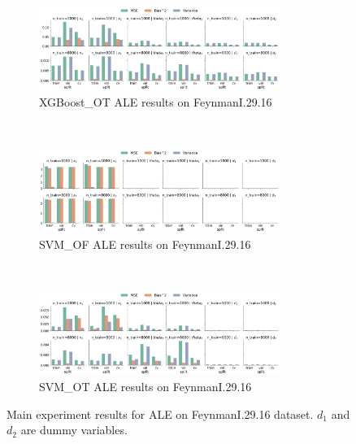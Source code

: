 \documentclass[runningheads]{llncs}
\begin{document}
\begin{figure}[ht]
    \centering
    \ContinuedFloat\
    \begin{subfigure}[b]{\textwidth}
        \centering
        \includegraphics[width=0.86\textwidth]{img/FeynmanI.29.16-all/feature_effect_errors_ale_XGBoost_OT.png}
        \caption{XGBoost\_OT ALE results on FeynmanI.29.16}
    \end{subfigure}
    \\[10pt]
    \vfill
    \begin{subfigure}[b]{\textwidth}
        \centering
        \includegraphics[width=0.86\textwidth]{img/FeynmanI.29.16-all/feature_effect_errors_ale_SVM_OF.png}
        \caption{SVM\_OF ALE results on FeynmanI.29.16}
    \end{subfigure}
    \\[10pt]
    \vfill
    \begin{subfigure}[b]{\textwidth}
        \centering
        \includegraphics[width=0.86\textwidth]{img/FeynmanI.29.16-all/feature_effect_errors_ale_SVM_OT.png}
        \caption{SVM\_OT ALE results on FeynmanI.29.16}
    \end{subfigure}
    \label{fig:ale-results-feynman}  %
    \caption{Main experiment results for ALE on FeynmanI.29.16 dataset. $d_1$ and $d_2$ are dummy variables.}
\end{figure}
\end{document}
